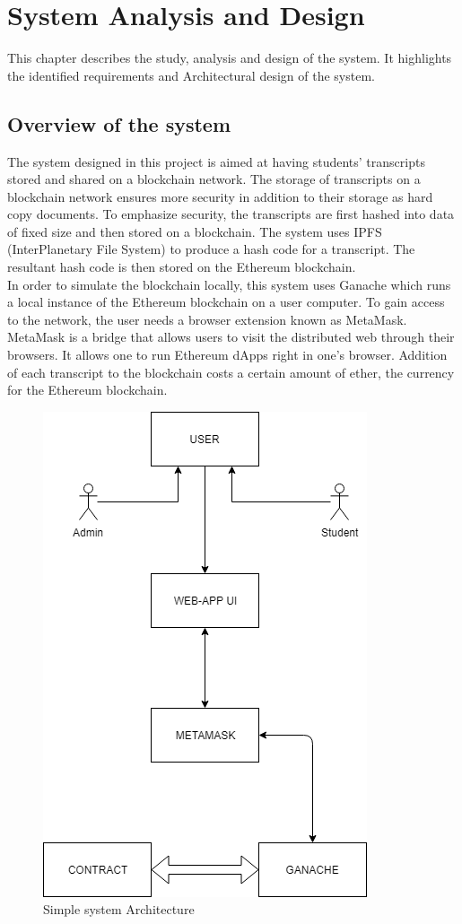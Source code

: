 \chapter{System Analysis and Design}
This chapter describes the study, analysis and design of the system. It highlights the identified requirements and Architectural design of the system.

\section{Overview of the system}
The system designed in this project is aimed at having students’ transcripts stored and shared on a blockchain network. The storage of transcripts on a blockchain network ensures more security in addition to their storage as hard copy documents.
To emphasize security, the transcripts are first hashed into data of fixed size and then stored on a blockchain. The system uses IPFS (InterPlanetary File System)\cite{art15} to produce a hash code for a transcript. The resultant hash code is then stored on the Ethereum blockchain.\\
In order to simulate the blockchain locally, this system uses Ganache which runs a local instance of the Ethereum blockchain on a user computer. To gain access to the network, the user needs a browser extension known as MetaMask. MetaMask is a bridge that allows users to visit the distributed web through their browsers. It allows one to run Ethereum dApps\cite{art15} right in one's browser. Addition of each transcript to the blockchain costs a certain amount of ether\cite{art16}, the currency for the Ethereum blockchain.
\begin{figure}[!h]
\centering
\includegraphics[scale=0.7]{images/simple_system.png}
\caption{Simple system Architecture}
\end{figure}

